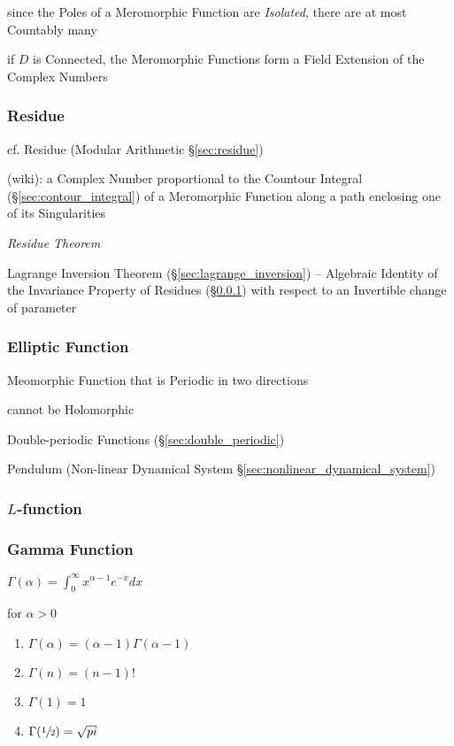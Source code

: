 since the Poles of a Meromorphic Function are \emph{Isolated}, there are at
most Countably many

if $D$ is Connected, the Meromorphic Functions form a Field Extension of the
Complex Numbers



\subsubsection{Residue}\label{sec:meromorphic_residue}

\fist cf. Residue (Modular Arithmetic \S\ref{sec:residue})

(wiki): a Complex Number proportional to the Countour Integral
(\S\ref{sec:contour_integral}) of a Meromorphic Function along a path enclosing
one of its Singularities

\emph{Residue Theorem}

Lagrange Inversion Theorem (\S\ref{sec:lagrange_inversion}) -- Algebraic
Identity of the Invariance Property of Residues
(\S\ref{sec:meromorphic_residue}) with respect to an Invertible change of
parameter



\subsubsection{Elliptic Function}\label{sec:elliptic_function}

Meomorphic Function that is Periodic in two directions

cannot be Holomorphic

Double-periodic Functions (\S\ref{sec:double_periodic})

Pendulum (Non-linear Dynamical System \S\ref{sec:nonlinear_dynamical_system})



\subsubsection{$L$-function}\label{sec:l_function}

\subsubsection{Gamma Function}\label{sec:gamma_function}

$\Gamma(\alpha) = \int_0^{\infty} x^{\alpha -1} e^{-x} dx$

for $\alpha > 0$

\begin{enumerate}
\item $\Gamma(\alpha) = (\alpha - 1) \Gamma(\alpha -1)$
\item $\Gamma(n) = (n-1)!$
\item $\Gamma(1) = 1$
\item $\Gamma(\sfrac{1}{2}) = \sqrt{pi}$
\end{enumerate}

